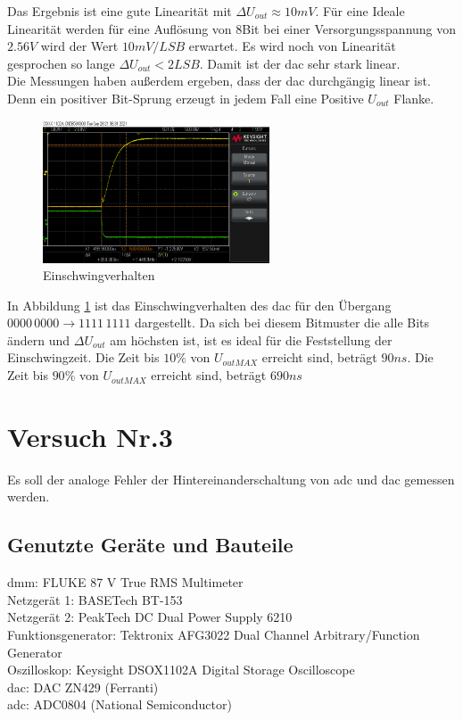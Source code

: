 \documentclass[12pt, a4paper, ngerman]{article}
\begin{document}
Das Ergebnis ist eine gute Linearität mit $\Delta U_{out}\approx 10mV$.
Für eine Ideale Linearität werden für eine Auflösung von 8Bit bei einer Versorgungsspannung von $2.56V$
wird der Wert $10mV/LSB$ erwartet. Es wird noch von Linearität gesprochen so lange $\Delta U_{out}<2LSB$.
Damit ist der \ac{dac} sehr stark linear. \\
Die Messungen haben außerdem ergeben, dass der \ac{dac} durchgängig linear ist.
Denn ein positiver Bit-Sprung erzeugt in jedem Fall eine Positive $U_{out}$ Flanke.

\begin{figure}%
  \centering
  \includegraphics[width=0.6\textwidth]{scope_34.png}
  \caption{Einschwingverhalten}
  \label{abb:einschwing1}
\end{figure}

In Abbildung \ref{abb:einschwing1} ist das Einschwingverhalten des \ac{dac} für den Übergang $0000\,0000\rightarrow 1111\,1111$
dargestellt. Da sich bei diesem Bitmuster die alle Bits ändern und $\Delta U_{out}$ am höchsten ist,
ist es ideal für die Feststellung der Einschwingzeit. Die Zeit bis $10\%$ von $U_{out MAX}$ erreicht sind,
beträgt $90ns$. Die Zeit bis $90\%$ von $U_{out MAX}$ erreicht sind,
beträgt $690ns$ %


\section{Versuch Nr.3}

Es soll der analoge Fehler der Hintereinanderschaltung von \ac{adc} und \ac{dac} gemessen werden.

\subsection{Genutzte Geräte und Bauteile}

\acl{dmm}: FLUKE 87 V True RMS Multimeter \\
Netzgerät 1: BASETech BT-153 \\
Netzgerät 2: PeakTech DC Dual Power Supply 6210 \\
Funktionsgenerator: Tektronix AFG3022 Dual Channel Arbitrary/Function Generator \\
Oszilloskop: Keysight DSOX1102A Digital Storage Oscilloscope \\
\ac{dac}: DAC ZN429 (Ferranti) \\
\ac{adc}: ADC0804 (National Semiconductor)
\end{document}
